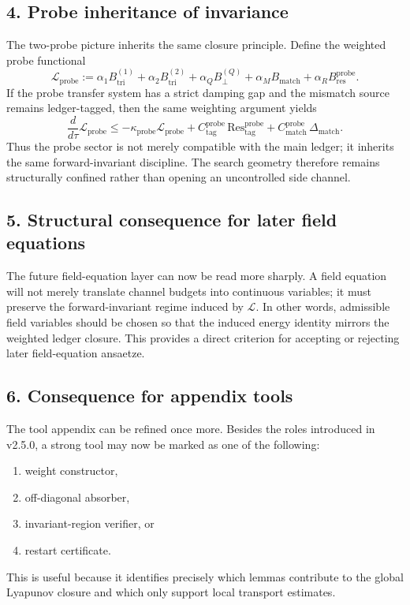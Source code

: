 \subsection*{4. Probe inheritance of invariance}
The two-probe picture inherits the same closure principle. Define the weighted probe
functional
\[
\mathcal L_{\mathrm{probe}}
:= \alpha_1 B^{(1)}_{\mathrm{tri}} + \alpha_2 B^{(2)}_{\mathrm{tri}}
+ \alpha_Q B^{(Q)}_{\perp} + \alpha_M B_{\mathrm{match}}
+ \alpha_R B^{\mathrm{probe}}_{\mathrm{res}}.
\]
If the probe transfer system has a strict damping gap and the mismatch source remains
ledger-tagged, then the same weighting argument yields
\[
\frac{d}{d\tau}\mathcal L_{\mathrm{probe}}
\le -\kappa_{\mathrm{probe}}\mathcal L_{\mathrm{probe}}
+ C^{\mathrm{probe}}_{\mathrm{tag}}\,\mathrm{Res}^{\mathrm{probe}}_{\mathrm{tag}}
+ C^{\mathrm{probe}}_{\mathrm{match}}\,\Delta_{\mathrm{match}}.
\]
Thus the probe sector is not merely compatible with the main ledger; it inherits the
same forward-invariant discipline. The search geometry therefore remains structurally
confined rather than opening an uncontrolled side channel.

\subsection*{5. Structural consequence for later field equations}
The future field-equation layer can now be read more sharply. A field equation will
not merely translate channel budgets into continuous variables; it must preserve the
forward-invariant regime induced by $\mathcal L$. In other words, admissible field
variables should be chosen so that the induced energy identity mirrors the weighted
ledger closure. This provides a direct criterion for accepting or rejecting later
field-equation ansaetze.

\subsection*{6. Consequence for appendix tools}
The tool appendix can be refined once more. Besides the roles introduced in v2.5.0,
a strong tool may now be marked as one of the following:
\begin{enumerate}[label=(\alph*)]
  \item weight constructor,
  \item off-diagonal absorber,
  \item invariant-region verifier, or
  \item restart certificate.
\end{enumerate}
This is useful because it identifies precisely which lemmas contribute to the global
Lyapunov closure and which only support local transport estimates.

